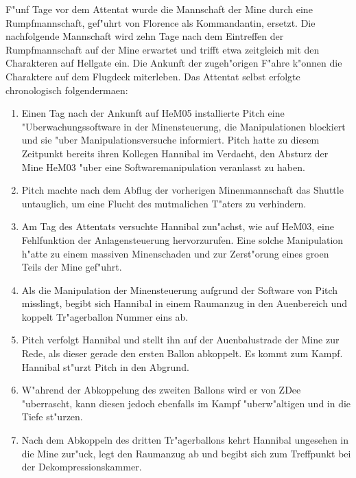 
F"unf Tage vor dem Attentat wurde die Mannschaft der Mine durch eine Rumpfmannschaft, gef"uhrt von Florence als Kommandantin, ersetzt. Die nachfolgende Mannschaft wird zehn Tage nach dem Eintreffen der Rumpfmannschaft auf der Mine erwartet und trifft etwa zeitgleich mit den Charakteren auf Hellgate ein. Die Ankunft der zugeh"origen F"ahre k"onnen die Charaktere auf dem Flugdeck miterleben. Das Attentat selbst erfolgte chronologisch folgenderma\3en:
 
\begin{enumerate}
	\item Einen Tag nach der Ankunft auf HeM05 installierte Pitch eine "Uberwachungssoftware in der Minensteuerung, die Manipulationen 
		blockiert und sie "uber Manipulationsversuche informiert. Pitch hatte zu diesem Zeitpunkt bereits ihren Kollegen Hannibal im Verdacht, den Absturz der Mine HeM03 "uber eine Softwaremanipulation veranlasst zu haben.
	\item Pitch machte nach dem Abflug der vorherigen Minenmannschaft das Shuttle untauglich, um eine Flucht des mutma\3lichen T"aters zu 
		verhindern.
	\item Am Tag des Attentats versuchte Hannibal zun"achst, wie auf HeM03, eine Fehlfunktion der Anlagensteuerung hervorzurufen. Eine 
		solche Manipulation h"atte zu einem massiven Minenschaden und zur Zerst"orung eines gro\3en Teils der Mine gef"uhrt.
	\item Als die Manipulation der Minensteuerung aufgrund der Software von Pitch misslingt, begibt sich Hannibal in einem Raumanzug in den 
		Au\3enbereich und koppelt Tr"agerballon Nummer eins ab.
	\item Pitch verfolgt Hannibal und stellt ihn auf der Au\3enbalustrade der Mine zur Rede, als dieser gerade den ersten Ballon abkoppelt. 
		Es kommt zum Kampf. Hannibal st"urzt Pitch in den Abgrund. 
	\item W"ahrend der Abkoppelung des zweiten Ballons wird er von ZDee "uberrascht, kann diesen jedoch ebenfalls im Kampf "uberw"altigen und 
		in die Tiefe st"urzen.
	\item Nach dem Abkoppeln des dritten Tr"agerballons kehrt Hannibal ungesehen in die Mine zur"uck, legt den Raumanzug ab und begibt sich 
		zum Treffpunkt bei der Dekompressionskammer. 
\end{enumerate}


